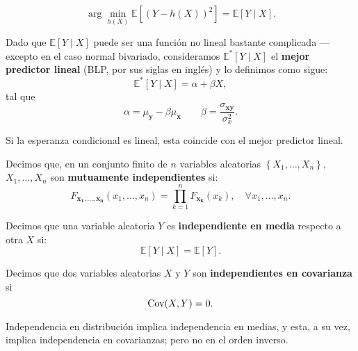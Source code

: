\documentclass[8pt,a4paper]{extarticle}
\begin{document}
\begin{multicols}{3}
\begin{boxprop}[]
	\[
		\arg\min_{h(X)} \mathbb{E}\left[ \left( Y - h(X) \right)^2  \right] = \mathbb{E}\left[ Y  \mid X \right] 
	.\] 
\end{boxprop}

\begin{boxdef}
	Dado que $\mathbb{E}[Y  \mid X]$ puede ser una función no lineal bastante complicada --- excepto en el caso normal bivariado, consideramos $\mathbb{E}^* [Y  \mid X]$ el \textbf{mejor predictor lineal} (BLP, por sus siglas en inglés) y lo definimos como sigue:
	\[
		\mathbb{E}^*\left[ Y  \mid X \right] = \alpha + \beta X
	,\] 
	tal que
	\[
		\alpha = \mu_{\mathbf{y}} - \beta \mu_{\mathbf{x}} \qquad \beta = \frac{\sigma_{\mathbf{xy}}}{\sigma^2_{x}}
	.\] 
\end{boxdef}

\begin{boxtheo}[]
	Si la esperanza condicional es lineal, esta coincide con el mejor predictor lineal.
\end{boxtheo}

\sectionbreak

\begin{boxdef}
	Decimos que, en un conjunto finito de $n$ variables aleatorias $\left\{ X_1, \ldots, X_n \right\}$, $X_1, \ldots, X_n$ son \textbf{mutuamente independientes} si:
	\[
		F_{\mathbf{x_1,\ldots,x_n}} (x_1, \ldots, x_n) = \prod_{k=1}^{n} F_{\mathbf{x_k}} (x_k), \quad \forall x_1, \ldots, x_n
	.\] 
\end{boxdef}

\begin{boxdef}
	Decimos que una variable aleatoria $Y$ es \textbf{independiente en media} respecto a otra $X$ si:
	\[
		\mathbb{E}[Y  \mid X] = \mathbb{E}[Y]
	.\] 
\end{boxdef}

\begin{boxdef}
	Decimos que dos variables aleatorias $X$ y $Y$ son \textbf{independientes en covarianza} si
	\[
		\text{\normalfont Cov}(X,Y) = 0
	.\] 
\end{boxdef}

\begin{boxtheo}[]
	Independencia en distribución implica independencia en medias, y esta, a su vez, implica independencia en covarianzas; pero no en el orden inverso.
\end{boxtheo}


\end{multicols}
\end{document}
